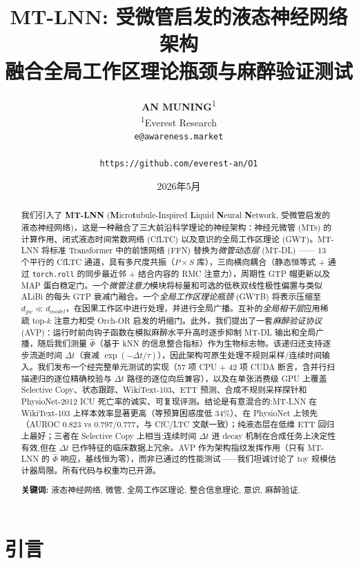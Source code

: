 \documentclass[11pt]{article}
\title{
  \textbf{MT-LNN: 受微管启发的液态神经网络架构\\
  融合全局工作区理论瓶颈与麻醉验证测试}
}
\author{
  \textbf{AN MUNING}\textsuperscript{1} \\
  \textsuperscript{1}Everest Research \\
  \texttt{e@awareness.market} \\
  \vspace{0.2cm} \\
  \texttt{https://github.com/everest-an/O1}
}
\date{2026年5月}
\theoremstyle{definition}
\newcommand{\phihat}{\hat{\Phi}}
\begin{document}
\maketitle

\begin{abstract}
我们引入了 \textbf{MT-LNN} (\textbf{M}icro\textbf{t}ubule-Inspired \textbf{L}iquid \textbf{N}eural \textbf{N}etwork, 受微管启发的液态神经网络)，这是一种融合了三大前沿科学理论的神经架构：神经元微管 (MTs) 的计算作用、闭式液态时间常数网络 (CfLTC) 以及意识的全局工作区理论 (GWT)。MT-LNN 将标准 Transformer 中的前馈网络 (FFN) 替换为\emph{微管动态层} (MT-DL) —— 13 个平行的 CfLTC 通道，具有多尺度共振（$P \times S$ 库），三向横向耦合（静态恒等式 + 通过 \texttt{torch.roll} 的同步最近邻 + 结合内容的 RMC 注意力），周期性 GTP 帽更新以及 MAP 蛋白稳定门。一个\emph{微管注意力}模块将标量和可选的低秩双线性极性偏置与类似 ALiBi 的每头 GTP 衰减门融合。一个\emph{全局工作区理论瓶颈} (GWTB) 将表示压缩至 $d_{gw} \ll d_{model}$，在因果工作区中进行处理，并进行全局广播。互补的\emph{全局相干层}应用稀疏 top-$k$ 注意力和受 Orch-OR 启发的坍缩门。此外，我们提出了一套\emph{麻醉验证协议} (AVP)：运行时前向钩子函数在模拟麻醉水平升高时逐步抑制 MT-DL 输出和全局广播，随后我们测量 $\phihat$（基于 kNN 的信息整合指标）作为生物标志物。该递归还支持逐步流逝时间 $\Delta t$（衰减 $\exp(-\Delta t/\tau)$），因此架构可原生处理不规则采样/连续时间输入。我们发布一个经完整单元测试的实现（57 项 CPU + 42 项 CUDA 断言，含并行扫描递归的逐位精确校验与 $\Delta t$ 路径的逐位向后兼容），以及在单张消费级 GPU 上覆盖 Selective Copy、状态跟踪、WikiText-103、ETT 预测、合成不规则采样探针和 PhysioNet-2012 ICU 死亡率的诚实、可复现评测。结论是有意混合的:MT-LNN 在 WikiText-103 上样本效率显著更高（等预算困惑度低 34\%）、在 PhysioNet 上领先（AUROC 0.823 vs 0.797/0.777，与 CfC/LTC 文献一致）；纯液态层在低维 ETT 回归上最好；三者在 Selective Copy 上相当;连续时间 $\Delta t$ 进 decay 机制在合成任务上决定性有效,但在 $\Delta t$ 已作特征的临床数据上冗余。AVP 作为架构指纹发挥作用（只有 MT-LNN 的 $\hat{\Phi}$ 响应，基线恒为零），而非已通过的性能测试——我们坦诚讨论了 toy 规模估计器局限。所有代码与权重均已开源。

\medskip
\noindent\textbf{关键词:} 液态神经网络, 微管, 全局工作区理论, 整合信息理论, 意识, 麻醉验证.
\end{abstract}

\section{引言}
\label{sec:intro}
\end{document}
